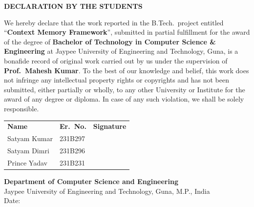 \newpage
\thispagestyle{plain}
\begingroup
\setlength{\parskip}{6pt}
\fontsize{14}{21}\selectfont

\begin{center}
    {\fontsize{16}{24}\selectfont\bfseries DECLARATION BY THE STUDENTS\\[12pt]}
\end{center}

We hereby declare that the work reported in the B.Tech.\ project entitled
``\textbf{Context Memory Framework}'',
submitted in partial fulfillment for the award of the degree of \textbf{Bachelor of
Technology in Computer Science \& Engineering} at Jaypee University of Engineering and
Technology, Guna, is a bonafide record of original work carried out by us under the
supervision of \textbf{Prof.\ Mahesh Kumar}. To the best of our knowledge and belief, this
work does not infringe any intellectual property rights or copyrights and has not been
submitted, either partially or wholly, to any other University or Institute for the award
of any degree or diploma. In case of any such violation, we shall be solely responsible.

\vfill

\noindent
\begin{tabular}{p{5.0cm} p{2.8cm} p{5.0cm}}
    \bfseries Name      & \bfseries Er.\ No. & \bfseries Signature            \\[20pt]
    Satyam Kumar        & 231B297            & \underline{\hspace{4cm}}       \\[16pt]
    Satyam Dimri        & 231B296            & \underline{\hspace{4cm}}       \\[16pt]
    Prince Yadav        & 231B231            & \underline{\hspace{4cm}}       \\
\end{tabular}

\vspace{1cm}
\noindent\textbf{Department of Computer Science and Engineering}\\
Jaypee University of Engineering and Technology, Guna, M.P., India\\[8pt]
Date:\enspace\underline{\hspace{3.5cm}}

\endgroup
\clearpage
